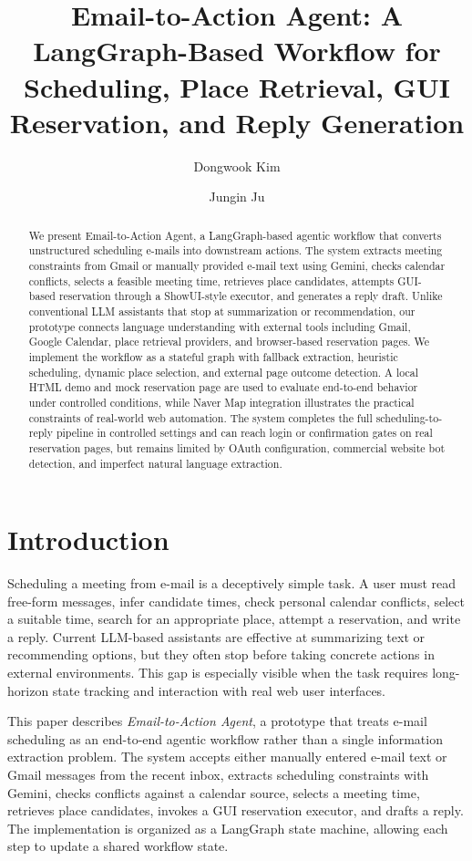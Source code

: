 \documentclass[sigconf,nonacm]{acmart}
\title{Email-to-Action Agent: A LangGraph-Based Workflow for Scheduling, Place Retrieval, GUI Reservation, and Reply Generation}
\author{Dongwook Kim}
\affiliation{
  \institution{Soongsil University}
  \country{Republic of Korea}
}
\author{Jungin Ju}
\affiliation{
  \institution{Soongsil University}
  \country{Republic of Korea}
}
\begin{document}
\begin{abstract}
We present Email-to-Action Agent, a LangGraph-based agentic workflow that converts unstructured scheduling e-mails into downstream actions. The system extracts meeting constraints from Gmail or manually provided e-mail text using Gemini, checks calendar conflicts, selects a feasible meeting time, retrieves place candidates, attempts GUI-based reservation through a ShowUI-style executor, and generates a reply draft. Unlike conventional LLM assistants that stop at summarization or recommendation, our prototype connects language understanding with external tools including Gmail, Google Calendar, place retrieval providers, and browser-based reservation pages. We implement the workflow as a stateful graph with fallback extraction, heuristic scheduling, dynamic place selection, and external page outcome detection. A local HTML demo and mock reservation page are used to evaluate end-to-end behavior under controlled conditions, while Naver Map integration illustrates the practical constraints of real-world web automation. The system completes the full scheduling-to-reply pipeline in controlled settings and can reach login or confirmation gates on real reservation pages, but remains limited by OAuth configuration, commercial website bot detection, and imperfect natural language extraction.
\end{abstract}


\maketitle

\section{Introduction}
Scheduling a meeting from e-mail is a deceptively simple task. A user must read free-form messages, infer candidate times, check personal calendar conflicts, select a suitable time, search for an appropriate place, attempt a reservation, and write a reply. Current LLM-based assistants are effective at summarizing text or recommending options, but they often stop before taking concrete actions in external environments. This gap is especially visible when the task requires long-horizon state tracking and interaction with real web user interfaces.

This paper describes \textit{Email-to-Action Agent}, a prototype that treats e-mail scheduling as an end-to-end agentic workflow rather than a single information extraction problem. The system accepts either manually entered e-mail text or Gmail messages from the recent inbox, extracts scheduling constraints with Gemini, checks conflicts against a calendar source, selects a meeting time, retrieves place candidates, invokes a GUI reservation executor, and drafts a reply. The implementation is organized as a LangGraph state machine, allowing each step to update a shared workflow state.
\end{document}
